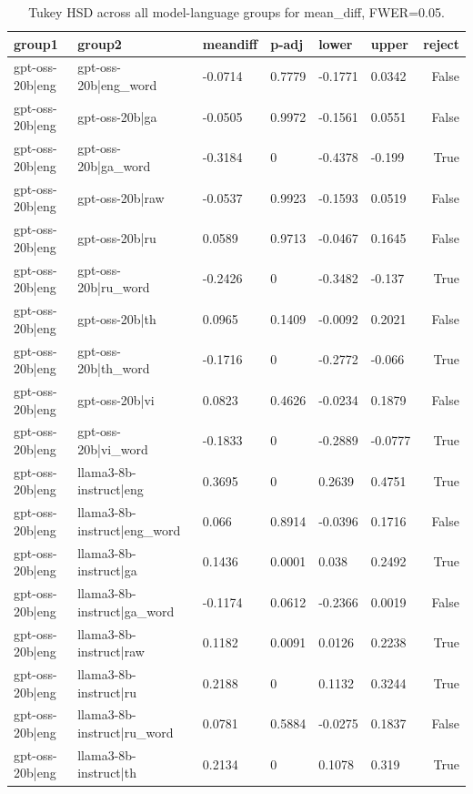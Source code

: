 \begin{table}
\caption{Tukey HSD across all model-language groups for mean_diff, FWER=0.05.}
\label{tab:tukey_all_models_all_langs_mean_diff}
\begin{tabular}{llllllr}
\toprule
group1 & group2 & meandiff & p-adj & lower & upper & reject \\
\midrule
gpt-oss-20b|eng & gpt-oss-20b|eng_word & -0.0714 & 0.7779 & -0.1771 & 0.0342 & False \\
gpt-oss-20b|eng & gpt-oss-20b|ga & -0.0505 & 0.9972 & -0.1561 & 0.0551 & False \\
gpt-oss-20b|eng & gpt-oss-20b|ga_word & -0.3184 & 0 & -0.4378 & -0.199 & True \\
gpt-oss-20b|eng & gpt-oss-20b|raw & -0.0537 & 0.9923 & -0.1593 & 0.0519 & False \\
gpt-oss-20b|eng & gpt-oss-20b|ru & 0.0589 & 0.9713 & -0.0467 & 0.1645 & False \\
gpt-oss-20b|eng & gpt-oss-20b|ru_word & -0.2426 & 0 & -0.3482 & -0.137 & True \\
gpt-oss-20b|eng & gpt-oss-20b|th & 0.0965 & 0.1409 & -0.0092 & 0.2021 & False \\
gpt-oss-20b|eng & gpt-oss-20b|th_word & -0.1716 & 0 & -0.2772 & -0.066 & True \\
gpt-oss-20b|eng & gpt-oss-20b|vi & 0.0823 & 0.4626 & -0.0234 & 0.1879 & False \\
gpt-oss-20b|eng & gpt-oss-20b|vi_word & -0.1833 & 0 & -0.2889 & -0.0777 & True \\
gpt-oss-20b|eng & llama3-8b-instruct|eng & 0.3695 & 0 & 0.2639 & 0.4751 & True \\
gpt-oss-20b|eng & llama3-8b-instruct|eng_word & 0.066 & 0.8914 & -0.0396 & 0.1716 & False \\
gpt-oss-20b|eng & llama3-8b-instruct|ga & 0.1436 & 0.0001 & 0.038 & 0.2492 & True \\
gpt-oss-20b|eng & llama3-8b-instruct|ga_word & -0.1174 & 0.0612 & -0.2366 & 0.0019 & False \\
gpt-oss-20b|eng & llama3-8b-instruct|raw & 0.1182 & 0.0091 & 0.0126 & 0.2238 & True \\
gpt-oss-20b|eng & llama3-8b-instruct|ru & 0.2188 & 0 & 0.1132 & 0.3244 & True \\
gpt-oss-20b|eng & llama3-8b-instruct|ru_word & 0.0781 & 0.5884 & -0.0275 & 0.1837 & False \\
gpt-oss-20b|eng & llama3-8b-instruct|th & 0.2134 & 0 & 0.1078 & 0.319 & True \\

\end{tabular}
\end{table}
